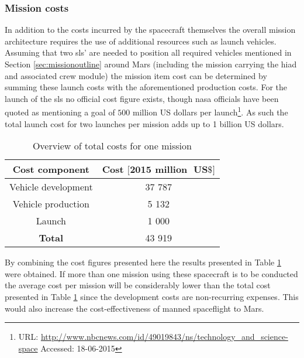 \subsubsection{Mission costs}
In addition to the costs incurred by the spacecraft themselves the overall mission architecture requires the use of additional resources such as launch vehicles. Assuming that two \gls{sls}' are needed to position all required vehicles mentioned in Section \ref{sec:missionoutline} around Mars (including the mission carrying the \gls{hiad} and associated crew module) the mission item cost can be determined by summing these launch costs with the aforementioned production costs. For the launch of the \gls{sls} no official cost figure exists, though \gls{nasa} officials have been quoted as mentioning a goal of $500$ million US dollars per launch\footnote{URL: \url{http://www.nbcnews.com/id/49019843/ns/technology_and_science-space} Accessed: 18-06-2015}. As such the total launch cost for two launches per mission adds up to 1 billion US dollars.


\begin{table}[H]
	\centering
	\caption{Overview of total costs for one mission}
	\begin{tabular}{|c|c|}
		\hline
		\textbf{Cost component} & \textbf{Cost $\mathbf{[2015}$ $\mathbf{million \mbox{ } US\$]}$} \\ \hline 
		\hline
		Vehicle development & 37 787 \\
		Vehicle production & 5 132\\
		Launch & 1 000\\ \hline
		\textbf{Total} & 43 919\\ \hline
	\end{tabular}
	\label{tab:missioncosts}
\end{table}

By combining the cost figures presented here the results presented in Table \ref{tab:missioncosts} were obtained. If more than one mission using these spacecraft is to be conducted the average cost per mission will be considerably lower than the total cost presented in Table \ref{tab:missioncosts} since the development costs are non-recurring expenses. This would also increase the cost-effectiveness of manned spaceflight to Mars.